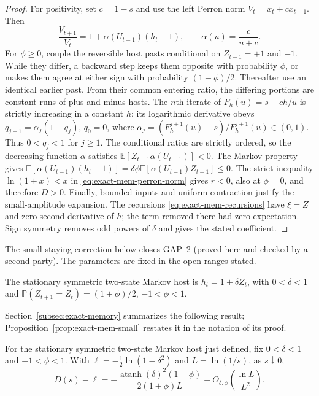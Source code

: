 \begin{proof}
For positivity, set $c=1-s$ and use the left Perron norm
$V_t=x_t+c x_{t-1}$. Then
\begin{equation}
 \frac{V_{t+1}}{V_t}=1+\alpha(U_{t-1})(h_t-1),\qquad
 \alpha(u)=\frac{c}{u+c}.
 \label{eq:exact-mem-perron-norm}
\end{equation}
For $\phi\geq0$, couple the reversible host pasts conditional on
$Z_{t-1}=+1$ and $-1$. While they differ, a backward step keeps them
opposite with probability $\phi$, or makes them agree at either sign
with probability $(1-\phi)/2$. Thereafter use an identical earlier
past. From their common entering ratio, the differing portions are
constant runs of plus and minus hosts. The $n$th iterate of
$F_h(u)=s+ch/u$ is strictly increasing in a constant $h$: its
logarithmic derivative obeys $q_{j+1}=\alpha_j(1-q_j)$, $q_0=0$,
where $\alpha_j=(F_h^{j+1}(u)-s)/F_h^{j+1}(u)\in(0,1)$.
Thus $0<q_j<1$ for $j\geq1$. The conditional ratios are strictly
ordered, so the decreasing function $\alpha$ satisfies
$\mathbb E[Z_{t-1}\alpha(U_{t-1})]<0$.
The Markov property gives
$\mathbb E[\alpha(U_{t-1})(h_t-1)]
=\delta\phi\mathbb E[\alpha(U_{t-1})Z_{t-1}]\leq0$.
The strict inequality $\ln(1+x)<x$ in
\eqref{eq:exact-mem-perron-norm} gives $r<0$, also at $\phi=0$,
and therefore $D>0$.
Finally, bounded inputs and uniform contraction justify the
small-amplitude expansion. The recursions
\eqref{eq:exact-mem-recursions} have $\xi=Z$ and zero second
derivative of $h$; the term removed there had zero expectation.
Sign symmetry removes odd powers of $\delta$ and gives the stated coefficient.
\end{proof}

The small-staying correction below closes GAP~2 (proved here and checked
by a second party). The parameters are fixed in the open ranges stated.

The stationary symmetric two-state Markov host is $h_t=1+\delta Z_t$, with $0<\delta<1$ and $\mathbb P(Z_{t+1}=Z_t)=(1+\phi)/2$, $-1<\phi<1$.

Section~\ref{subsec:exact-memory} summarizes the following result; Proposition~\ref{prop:exact-mem-small} restates it in the notation of its proof.

\begin{proposition}\label{prop:exact-memory-small}
For the stationary symmetric two-state Markov host just defined, fix
$0<\delta<1$ and $-1<\phi<1$. With
$\ell=-\tfrac12\ln(1-\delta^2)$ and $L=\ln(1/s)$, as $s\downarrow0$,
\begin{equation}
 D(s)-\ell=-\frac{\operatorname{atanh}(\delta)^2(1-\phi)}{2(1+\phi)L}
 +O_{\delta,\phi}\!\left(\frac{\ln L}{L^2}\right).
 \label{eq:exact-memory-small}
\end{equation}
\end{proposition}

